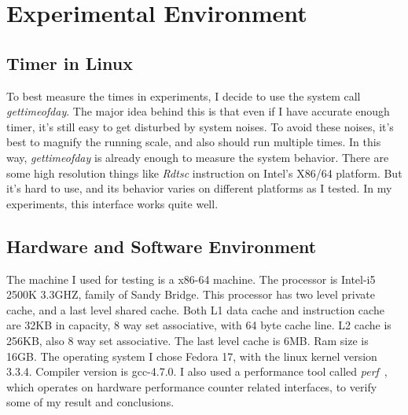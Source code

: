 \section{Experimental Environment}
	\label{sec:timing}
\subsection{Timer in Linux}
To best measure the times in experiments, I decide to use the system call
\emph{gettimeofday}. The major idea behind this is that even if I have accurate
enough timer, it's still easy to get disturbed by system noises. To avoid these
noises, it's best to magnify the running scale, and also should run multiple
times. In this way, \emph{gettimeofday} is already enough to measure the system
behavior. There are some high resolution things like \emph{Rdtsc} instruction
on Intel's X86/64 platform. But it's hard to use, and its behavior varies on
different platforms as I tested. In my experiments, this interface works quite well.

\subsection{Hardware and Software Environment}
The machine I used for testing is a x86-64 machine. The processor is Intel-i5
2500K 3.3GHZ, family of Sandy Bridge. This processor has two level private
cache, and a last level shared cache. Both L1 data cache and instruction cache
are 32KB in capacity, 8 way set associative, with 64 byte cache line. L2 cache
is 256KB, also 8 way set associative. The last level cache is 6MB. Ram size is
16GB. The operating system I chose Fedora 17, with the linux kernel version
3.3.4. Compiler version is gcc-4.7.0. I also used a performance tool called
\emph{perf}~\cite{perf}, which operates on hardware performance counter related
interfaces, to verify some of my result and conclusions.

